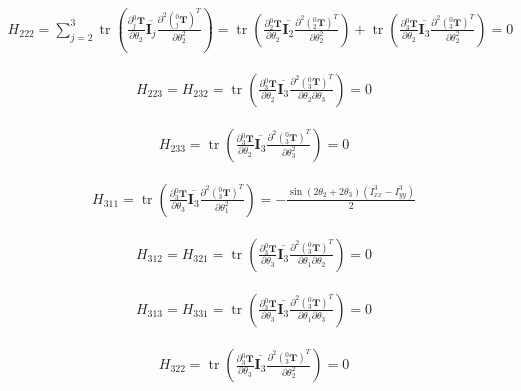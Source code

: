 \documentclass{homework}
\begin{document}
\begin{sol}
\begin{align*}
  H_{222} = \sum_{j=2}^3 \operatorname{tr} (\frac{\partial {^0_j}\mathbf{T}}{\partial \theta_2} \overline{\mathbf{I}_j} \frac{\partial^2 ({^0_j}\mathbf{T})^T}{\partial \theta_2^2}) 
          = \operatorname{tr} (\frac{\partial {^0_2}\mathbf{T}}{\partial \theta_2} \overline{\mathbf{I}_2} \frac{\partial^2 ({^0_2}\mathbf{T})^T}{\partial \theta_2^2}) + \operatorname{tr} (\frac{\partial {^0_3}\mathbf{T}}{\partial \theta_2} \overline{\mathbf{I}_3} \frac{\partial^2 ({^0_3}\mathbf{T})^T}{\partial \theta_2^2})
          = 0
\end{align*}

\begin{align*}
  H_{223} = H_{232} = \operatorname{tr} (\frac{\partial {^0_3}\mathbf{T}}{\partial \theta_2} \overline{\mathbf{I}_3} \frac{\partial^2 ({^0_3}\mathbf{T})^T}{\partial \theta_2 \partial \theta_3}) 
                    = 0
\end{align*}

\begin{align*}
  H_{233} = \operatorname{tr} (\frac{\partial {^0_3}\mathbf{T}}{\partial \theta_2} \overline{\mathbf{I}_3} \frac{\partial^2 ({^0_3}\mathbf{T})^T}{\partial \theta_3^2}) 
          = 0
\end{align*}

\begin{align*}
  H_{311} = \operatorname{tr} (\frac{\partial {^0_3}\mathbf{T}}{\partial \theta_3} \overline{\mathbf{I}_3} \frac{\partial^2 ({^0_3}\mathbf{T})^T}{\partial \theta_1^2}) 
          = -\frac{\sin(2\theta_2 + 2\theta_3) (I_{xx}^3 - I_{yy}^3)}{2}
\end{align*}

\begin{align*}
  H_{312} = H_{321} = \operatorname{tr} (\frac{\partial {^0_3}\mathbf{T}}{\partial \theta_3} \overline{\mathbf{I}_3} \frac{\partial^2 ({^0_3}\mathbf{T})^T}{\partial \theta_1 \partial \theta_2})
                    = 0
\end{align*}

\begin{align*}
  H_{313} = H_{331} = \operatorname{tr} (\frac{\partial {^0_3}\mathbf{T}}{\partial \theta_3} \overline{\mathbf{I}_3} \frac{\partial^2 ({^0_3}\mathbf{T})^T}{\partial \theta_1 \partial \theta_3}) 
                    = 0
\end{align*}

\begin{align*}
  H_{322} = \operatorname{tr} (\frac{\partial {^0_3}\mathbf{T}}{\partial \theta_3} \overline{\mathbf{I}_3} \frac{\partial^2 ({^0_3}\mathbf{T})^T}{\partial \theta_2^2})
          = 0
\end{align*}


\end{sol}
\end{document}
